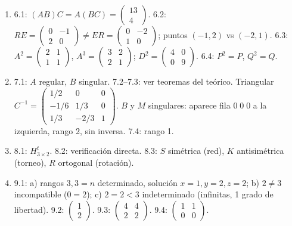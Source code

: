 \documentclass[a4paper,12pt]{article}
\theoremstyle{definition}
\begin{document}
\begin{enumerate}[label=\textbf{\arabic*.}, leftmargin=*]
\item[6.] 6.1: $(AB)C=A(BC)=\begin{pmatrix}13\\4\end{pmatrix}$. 6.2: $RE=\begin{pmatrix}0&-1\\2&0\end{pmatrix}\neq ER=\begin{pmatrix}0&-2\\1&0\end{pmatrix}$; puntos $(-1,2)$ vs $(-2,1)$. 6.3: $A^2=\begin{pmatrix}2&1\\1&1\end{pmatrix}$, $A^3=\begin{pmatrix}3&2\\2&1\end{pmatrix}$; $D^2=\begin{pmatrix}4&0\\0&9\end{pmatrix}$. 6.4: $P^2=P$, $Q^2=Q$.
\item[7.] 7.1: $A$ regular, $B$ singular. 7.2--7.3: ver teoremas del teórico. Triangular $C^{-1}=\begin{pmatrix}1/2&0&0\\-1/6&1/3&0\\1/3&-2/3&1\end{pmatrix}$. $B$ y $M$ singulares: aparece fila $0\;0\;0$ a la izquierda, rango 2, sin inversa. 7.4: rango 1.
\item[8.] 8.1: $H^t_{3\times2}$. 8.2: verificación directa. 8.3: $S$ simétrica (red), $K$ antisimétrica (torneo), $R$ ortogonal (rotación).
\item[9.] 9.1: a) rangos $3,3=n$ determinado, solución $x=1,y=2,z=2$; b) $2\neq3$ incompatible ($0=2$); c) $2=2<3$ indeterminado (infinitas, 1 grado de libertad). 9.2: $\begin{pmatrix}1\\2\end{pmatrix}$. 9.3: $\begin{pmatrix}4&4\\2&2\end{pmatrix}$. 9.4: $\begin{pmatrix}1&1\\0&0\end{pmatrix}$.
\end{enumerate}
\end{document}
